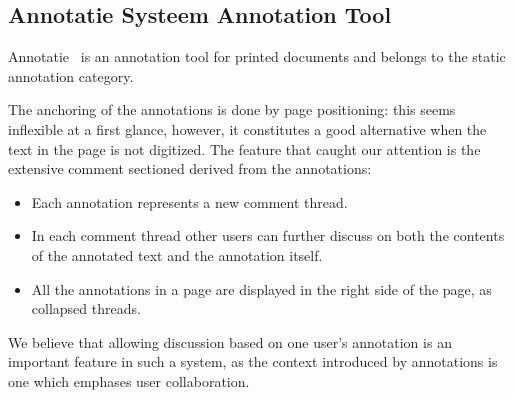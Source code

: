 \subsection{Annotatie Systeem Annotation Tool} %
Annotatie~\cite{annotatie:on} is an annotation tool for printed
documents and belongs to the static annotation category.\vspace{10pt}

The anchoring of the annotations is done by page positioning: this seems inflexible at a
first glance, however, it constitutes a good alternative when the text in the page is not
digitized.  The feature that caught our attention is the extensive comment sectioned
derived from the annotations:
\begin{itemize}
\item Each annotation represents a new comment thread.
\item In each comment thread other users can further discuss on both the contents of the
  annotated text and the annotation itself.
\item All the annotations in a page are displayed in the right side of the page, as
  collapsed threads.
\end{itemize}
We believe that allowing discussion based on one user's annotation is an important feature
in such a system, as the context introduced by annotations is one which emphases user
collaboration.


